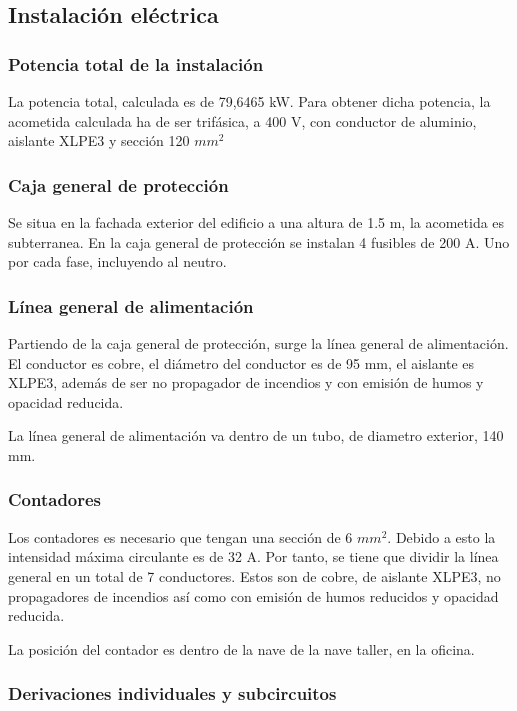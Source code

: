 \documentclass[../main.tex]{subfiles}
\begin{document}
\subsection{Instalación eléctrica}

\subsubsection{Potencia total de la instalación}

La potencia total, calculada es de 79,6465 kW. Para obtener dicha potencia, la acometida calculada ha de ser trifásica, a 400 V, con conductor de aluminio, aislante XLPE3 y sección 120 $mm^2$

\subsubsection{Caja general de protección}

Se situa en la fachada exterior del edificio a una altura de 1.5 m, la acometida es subterranea. En la caja general de protección se instalan 4 fusibles de 200 A. Uno por cada fase, incluyendo al neutro.

\subsubsection{Línea general de alimentación}

Partiendo de la caja general de protección, surge la línea general de alimentación. El conductor es cobre, el diámetro del conductor es de 95 mm, el aislante es XLPE3, además de ser no propagador de incendios y con emisión de humos y opacidad reducida.

La línea general de alimentación va dentro de un tubo, de diametro exterior, 140 mm.

\subsubsection{Contadores}

Los contadores es necesario que tengan una sección de 6 $mm^2$. Debido a esto la intensidad máxima circulante es de 32 A. Por tanto, se tiene que dividir la línea general en un total de 7 conductores. Estos son de cobre, de aislante XLPE3, no propagadores de incendios así como con emisión de humos reducidos y opacidad reducida.

La posición del contador es dentro de la nave de la nave taller, en la oficina.

\subsubsection{Derivaciones individuales y subcircuitos}
\end{document}
